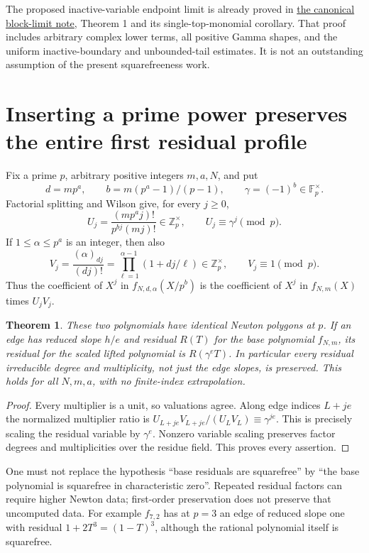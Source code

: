 \documentclass[11pt]{article}
\newtheorem{theorem}{Theorem}
\newcommand{\F}{\mathbb F}
\newcommand{\Z}{\mathbb Z}
\begin{document}
The proposed inactive-variable endpoint limit is already proved in
\href{COUPLED_BLOCK_PERIODS.tex}{the canonical block-limit note},
Theorem 1 and its single-top-monomial corollary. That proof includes
arbitrary complex lower terms, all positive Gamma shapes, and the
uniform inactive-boundary and unbounded-tail estimates. It is not an
outstanding assumption of the present squarefreeness work.

\section{Inserting a prime power preserves the entire first residual profile}
Fix a prime $p$, arbitrary positive integers $m,a,N$, and put
\[
 d=mp^a,\qquad b=m(p^a-1)/(p-1),\qquad\gamma=(-1)^b\in\F_p^\times.
\]
Factorial splitting and Wilson give, for every $j\ge0$,
\[
 U_j=\frac{(mp^aj)!}{p^{bj}(mj)!}\in\Z_p^\times,
 \qquad U_j\equiv\gamma^j\pmod p.                 \tag{1}
\]
If $1\le\alpha\le p^a$ is an integer, then also
\[
 V_j=\frac{(\alpha)_{dj}}{(dj)!}
     =\prod_{\ell=1}^{\alpha-1}(1+dj/\ell)
     \in\Z_p^\times,\qquad V_j\equiv1\pmod p.     \tag{2}
\]
Thus the coefficient of $X^j$ in $f_{N,d,\alpha}(X/p^b)$ is
the coefficient of $X^j$ in $f_{N,m}(X)$ times $U_jV_j$.

\begin{theorem}\label{thm:lift}
These two polynomials have identical Newton polygons at $p$.
If an edge has reduced slope $h/e$ and residual $R(T)$ for the base
polynomial $f_{N,m}$, its residual for the scaled lifted polynomial is
$R(\gamma^eT)$. In particular every residual irreducible degree and
multiplicity, not just the edge slopes, is preserved.
This holds for all $N,m,a$, with no finite-index extrapolation.
\end{theorem}
\begin{proof}
Every multiplier is a unit, so valuations agree. Along edge indices
$L+je$ the normalized multiplier ratio is
$U_{L+je}V_{L+je}/(U_LV_L)\equiv\gamma^{je}$.
This is precisely scaling the residual variable by $\gamma^e$.
Nonzero variable scaling preserves factor degrees and multiplicities
over the residue field. This proves every assertion.
\end{proof}

One must not replace the hypothesis ``base residuals are squarefree'' by
``the base polynomial is squarefree in characteristic zero''. Repeated
residual factors can require higher Newton data; first-order preservation
does not preserve that uncomputed data. For example $f_{7,2}$ has at $p=3$
an edge of reduced slope one with residual $1+2T^3=(1-T)^3$,
although the rational polynomial itself is squarefree.
\end{document}
